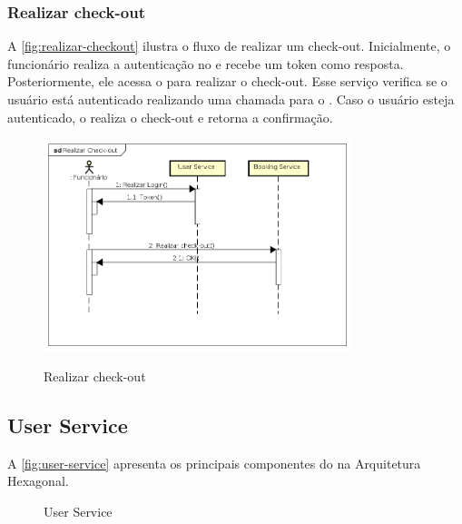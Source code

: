 \subsubsection{Realizar check-out}
A \autoref{fig:realizar-checkout} ilustra o fluxo de realizar um check-out. Inicialmente, o funcionário realiza a autenticação no  e recebe um token como resposta. Posteriormente, ele acessa o  para realizar o check-out. Esse serviço verifica se o usuário está autenticado realizando uma chamada para o . Caso o usuário esteja autenticado, o  realiza o check-out e retorna a confirmação.

\begin{figure}[H]
    \centering
    \caption{Realizar check-out}
    \includegraphics[width=0.8\textwidth]{media/realizar-checkout.png}
    \label{fig:realizar-checkout}
\end{figure}

\subsection{User Service}
A \autoref{fig:user-service} apresenta os principais componentes do  na Arquitetura Hexagonal.

\begin{figure}[H]
    \centering
    \caption{User Service}
    \label{fig:user-service}
\end{figure}

